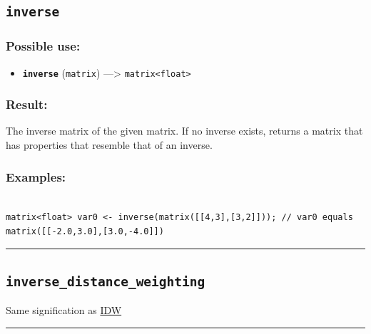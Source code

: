 \documentclass[]{book}
\providecommand{\tightlist}{%
  \setlength{\itemsep}{0pt}\setlength{\parskip}{0pt}}
\theoremstyle{definition}
\theoremstyle{definition}
\theoremstyle{definition}
\theoremstyle{remark}
\begin{document}
\subsection{\texorpdfstring{\texttt{inverse}}{inverse}}\label{inverse}

\subsubsection{Possible use:}\label{possible-use-283}

\begin{itemize}
\tightlist
\item
  \textbf{\texttt{inverse}} (\texttt{matrix}) ---\textgreater{}
  \texttt{matrix\textless{}float\textgreater{}}
\end{itemize}

\subsubsection{Result:}\label{result-273}

The inverse matrix of the given matrix. If no inverse exists, returns a
matrix that has properties that resemble that of an inverse.

\subsubsection{Examples:}\label{examples-213}

\begin{verbatim}
 
matrix<float> var0 <- inverse(matrix([[4,3],[3,2]])); // var0 equals matrix([[-2.0,3.0],[3.0,-4.0]])
\end{verbatim}

\begin{center}\rule{0.5\linewidth}{\linethickness}\end{center}

\subsection{\texorpdfstring{\texttt{inverse\_distance\_weighting}}{inverse\_distance\_weighting}}\label{inverse_distance_weighting}

Same signification as \href{operators-i-to-m.html\#IDW}{IDW}

\begin{center}\rule{0.5\linewidth}{\linethickness}\end{center}
\end{document}
